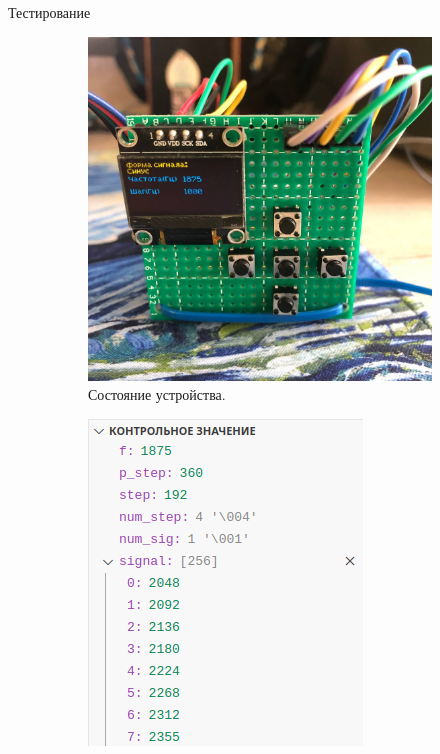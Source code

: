 \documentclass[10pt]{beamer}
\begin{document}
\begin{frame}{Тестирование}
\begin{figure}
     \begin{subfigure}[H]{0.45\textwidth}
         \centering
         \includegraphics[width=\textwidth]{test4_u_f}
         \caption{Состояние устройства.}
     \end{subfigure}
     \hfill
     \begin{subfigure}[H]{0.45\textwidth}
         \centering
         \includegraphics[width=\textwidth]{test4_o_f}

\end{subfigure}
\end{figure}
\end{frame}
\end{document}
